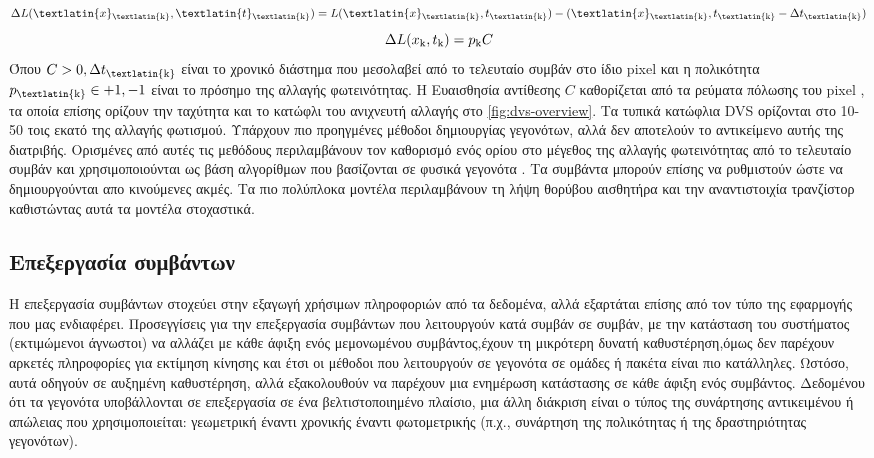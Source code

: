 \documentclass[12pt]{report}
\begin{document}
\begin{equation}
    \Delta L(\textlatin{x}\textsubscript{\textlatin{k}},\textlatin{t}\textsubscript{\textlatin{k}}) = L(\textlatin{x}\textsubscript{\textlatin{k}},t\textsubscript{\textlatin{k}})-(\textlatin{x}\textsubscript{\textlatin{k}},t\textsubscript{\textlatin{k}}-\Delta t\textsubscript{\textlatin{k}})
\end{equation}
\begin{equation}
   \Delta L(x\textsubscript{k},t\textsubscript{k}) = p\textsubscript{k}C 
\end{equation}
Όπου \(C > 0, \Delta t\textsubscript{\textlatin{k}}\) είναι το χρονικό διάστημα που μεσολαβεί από το τελευταίο συμβάν στο ίδιο \textlatin{pixel} και η πολικότητα \(p\textsubscript{\textlatin{k}} \in {+1,-1}\) είναι το πρόσημο της αλλαγής φωτεινότητας\cite{Lichtsteiner2008}. Η Ευαισθησία αντίθεσης $C$ καθορίζεται από τα ρεύματα πόλωσης του \textlatin{pixel} \cite{nozaki2017} \cite{Gallego2020}, τα οποία επίσης ορίζουν την ταχύτητα και το κατώφλι του ανιχνευτή αλλαγής στο \ref{fig:dvs-overview}. Τα τυπικά κατώφλια \textlatin{DVS} ορίζονται στο 10-50 τοις εκατό της αλλαγής φωτισμού. Υπάρχουν πιο προηγμένες μέθοδοι δημιουργίας γεγονότων, αλλά δεν αποτελούν το αντικείμενο αυτής της διατριβής. Ορισμένες από αυτές τις μεθόδους περιλαμβάνουν τον καθορισμό ενός ορίου στο μέγεθος της αλλαγής φωτεινότητας από το τελευταίο συμβάν και χρησιμοποιούνται ως βάση αλγορίθμων που βασίζονται σε φυσικά γεγονότα \cite{Gallego2019}. Τα συμβάντα μπορούν επίσης να ρυθμιστούν ώστε να δημιουργούνται απο κινούμενες ακμές. Τα πιο πολύπλοκα μοντέλα περιλαμβάνουν τη λήψη θορύβου αισθητήρα και την αναντιστοιχία τρανζίστορ καθιστώντας αυτά τα μοντέλα στοχαστικά.

\subsection{Επεξεργασία συμβάντων}
Η επεξεργασία συμβάντων στοχεύει στην εξαγωγή χρήσιμων πληροφοριών από τα δεδομένα, αλλά εξαρτάται επίσης από τον τύπο της εφαρμογής που μας ενδιαφέρει. Προσεγγίσεις για την επεξεργασία συμβάντων που λειτουργούν κατά συμβάν σε συμβάν, με την κατάσταση του συστήματος (εκτιμώμενοι άγνωστοι) να αλλάζει με κάθε άφιξη ενός μεμονωμένου συμβάντος,έχουν τη μικρότερη δυνατή καθυστέρηση,όμως δεν παρέχουν αρκετές πληροφορίες για εκτίμηση κίνησης και έτσι οι μέθοδοι που λειτουργούν σε γεγονότα σε ομάδες ή πακέτα είναι πιο κατάλληλες. Ωστόσο, αυτά οδηγούν σε αυξημένη καθυστέρηση, αλλά εξακολουθούν να παρέχουν μια  ενημέρωση κατάστασης σε κάθε άφιξη ενός συμβάντος. Δεδομένου ότι τα γεγονότα υποβάλλονται σε επεξεργασία σε ένα βελτιστοποιημένο πλαίσιο, μια άλλη διάκριση είναι ο τύπος της συνάρτησης αντικειμένου ή απώλειας που χρησιμοποιείται: γεωμετρική έναντι χρονικής έναντι φωτομετρικής (π.χ., συνάρτηση της πολικότητας ή της δραστηριότητας γεγονότων).
\end{document}

